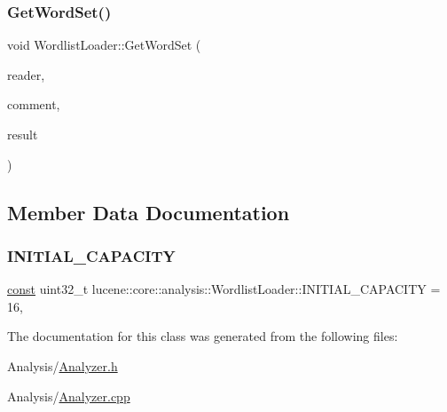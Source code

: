 \mbox{\label{classlucene_1_1core_1_1analysis_1_1WordlistLoader_a93e88980df89ba7a5574a5dbeabfd502}} 
\subsubsection{\texorpdfstring{Get\+Word\+Set()}{GetWordSet()}\hspace{0.1cm}{\footnotesize\ttfamily [4/4]}}
{\footnotesize\ttfamily void Wordlist\+Loader\+::\+Get\+Word\+Set (\begin{DoxyParamCaption}\item[{\mbox{\hyperlink{classlucene_1_1core_1_1analysis_1_1Reader}{Reader}} \&}]{reader,  }\item[{std\+::string \&}]{comment,  }\item[{\mbox{\hyperlink{classlucene_1_1core_1_1analysis_1_1characterutil_1_1CharSet}{characterutil\+::\+Char\+Set}} \&}]{result }\end{DoxyParamCaption})\hspace{0.3cm}{\ttfamily [static]}}



\subsection{Member Data Documentation}
\mbox{\label{classlucene_1_1core_1_1analysis_1_1WordlistLoader_a903bb8e9044b6ce1c4e09ffe405344b8}} 
\subsubsection{\texorpdfstring{I\+N\+I\+T\+I\+A\+L\+\_\+\+C\+A\+P\+A\+C\+I\+TY}{INITIAL\_CAPACITY}}
{\footnotesize\ttfamily \mbox{\hyperlink{ZlibCrc32_8h_a2c212835823e3c54a8ab6d95c652660e}{const}} uint32\+\_\+t lucene\+::core\+::analysis\+::\+Wordlist\+Loader\+::\+I\+N\+I\+T\+I\+A\+L\+\_\+\+C\+A\+P\+A\+C\+I\+TY = 16\hspace{0.3cm}{\ttfamily [static]}, {\ttfamily [private]}}



The documentation for this class was generated from the following files\+:\begin{DoxyCompactItemize}
\item 
Analysis/\mbox{\hyperlink{Analyzer_8h}{Analyzer.\+h}}\item 
Analysis/\mbox{\hyperlink{Analyzer_8cpp}{Analyzer.\+cpp}}\end{DoxyCompactItemize}
